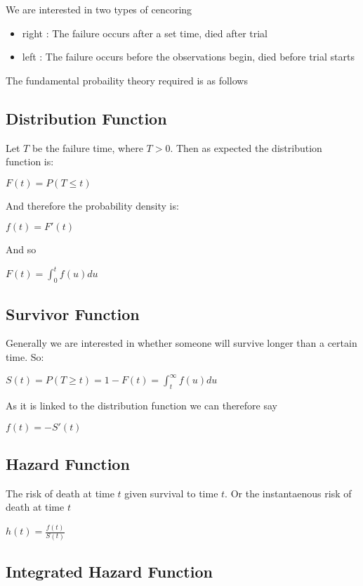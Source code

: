 \documentclass[
  letterpaper,
  DIV=11,
  numbers=noendperiod]{scrreprt}
\providecommand{\tightlist}{%
  \setlength{\itemsep}{0pt}\setlength{\parskip}{0pt}}\usepackage{longtable,booktabs,array}
\begin{document}
We are interested in two types of cencoring

\begin{itemize}
\tightlist
\item
  right : The failure occurs after a set time, died after trial
\item
  left : The failure occurs before the observations begin, died before
  trial starts
\end{itemize}

The fundamental probaility theory required is as follows

\hypertarget{distribution-function}{%
\subsection{Distribution Function}\label{distribution-function}}

Let \(T\) be the failure time, where \(T>0\). Then as expected the
distribution function is:

\(F(t) = P(T\leq t)\)

And therefore the probability density is:

\(f(t) = F'(t)\)

And so

\(F(t) = \int_0^tf(u)du\)

\hypertarget{survivor-function}{%
\subsection{Survivor Function}\label{survivor-function}}

Generally we are interested in whether someone will survive longer than
a certain time. So:

\(S(t) = P(T\geq t) = 1 - F(t) = \int^{\infty}_t f(u) du\)

As it is linked to the distribution function we can therefore say

\(f(t) = -S'(t)\)

\hypertarget{hazard-function}{%
\subsection{Hazard Function}\label{hazard-function}}

The risk of death at time \(t\) given survival to time \(t\). Or the
instantaenous risk of death at time \(t\)

\(h(t) = \frac{f(t)}{S(t)}\)

\hypertarget{integrated-hazard-function}{%
\subsection{Integrated Hazard
Function}\label{integrated-hazard-function}}
\end{document}
